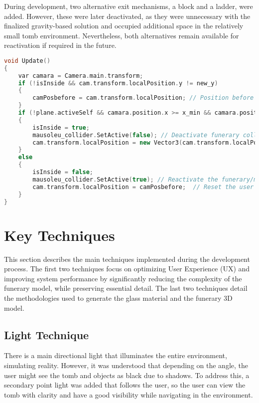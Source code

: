 During development, two alternative exit mechanisms, a block and a ladder, were added. However, these were later deactivated, as they were unnecessary with the finalized gravity-based solution and occupied additional space in the relatively small tomb environment. Nevertheless, both alternatives remain available for reactivation if required in the future.

\begin{lstlisting}[language=C++, caption={Vertical Descend approach in Update method().}, label={lst:vertical_descend},float]
void Update()
{
    var camara = Camera.main.transform;
    if (!isInside && cam.transform.localPosition.y != new_y)
    {
        camPosbefore = cam.transform.localPosition; // Position before entering the tomb
    }
    if (!plane.activeSelf && camara.position.x >= x_min && camara.position.x <= x_max && camara.position.z <= z_max && camara.position.z >= z_min && camara.position.y <= y_max && camara.position.y >= y_min) //check if position inside the tomb
    {
        isInside = true;
        mausoleu_collider.SetActive(false); // Deactivate funerary collider
        cam.transform.localPosition = new Vector3(cam.transform.localPosition.x, new_y, cam.transform.localPosition.z); //User replaced to a lower position
    }
    else
    {
        isInside = false;
        mausoleu_collider.SetActive(true); // Reactivate the funerary/mausoleum collider
        cam.transform.localPosition = camPosbefore;  // Reset the user's position
    }
}
\end{lstlisting}
\section{Key Techniques}
\label{sec:techniques}
This section describes the main techniques implemented during the development process. 
The first two techniques focus on optimizing User Experience (\gls{UX}) and improving system performance by significantly reducing the complexity of the funerary model, while preserving essential detail. 
The last two techniques detail the methodologies used to generate the glass material and the funerary \gls{3D} model.
\subsection{Light Technique}
There is a main directional light that illuminates the entire environment, simulating reality. 
However, it was understood that depending on the angle, the user might see the tomb and objects as black due to shadows. To address this, a secondary point light was added that follows the user, so the user can view the tomb with clarity and have a good visibility while navigating in the environment.

